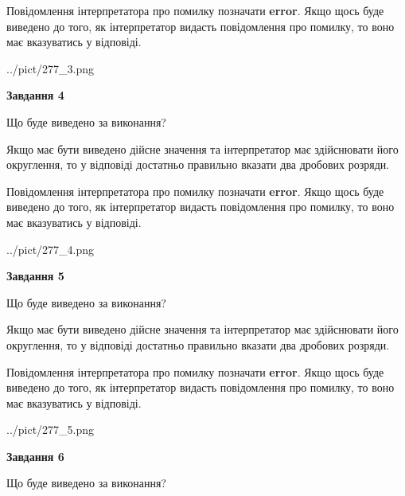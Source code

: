 \documentclass[12pt, ukrainian]{article}
\begin{document}
{\begin {Large}
Повідомлення інтерпретатора про помилку позначати \textbf{error}.
Якщо щось буде виведено до того, як інтерпретатор видасть повідомлення про помилку, 
то воно має вказуватись у відповіді. \par

\begin{center}
	{../pict/277_3.png}
\end{center}
\newpage

{\begin {center}\textbf{Завдання 4}\end {center}}\par
Що буде виведено за виконання? \par

Якщо має бути виведено дійсне значення та інтерпретатор має здійснювати його округлення, 
то у відповіді достатньо правильно вказати два дробових розряди.

Повідомлення інтерпретатора про помилку позначати \textbf{error}.
Якщо щось буде виведено до того, як інтерпретатор видасть повідомлення про помилку, 
то воно має вказуватись у відповіді. \par

\begin{center}
	{../pict/277_4.png}
\end{center}
\newpage

{\begin {center}\textbf{Завдання 5}\end {center}}\par
Що буде виведено за виконання? \par

Якщо має бути виведено дійсне значення та інтерпретатор має здійснювати його округлення, 
то у відповіді достатньо правильно вказати два дробових розряди.

Повідомлення інтерпретатора про помилку позначати \textbf{error}.
Якщо щось буде виведено до того, як інтерпретатор видасть повідомлення про помилку, 
то воно має вказуватись у відповіді. \par

\begin{center}
	{../pict/277_5.png}
\end{center}
\newpage

{\begin {center}\textbf{Завдання 6}\end {center}}\par
Що буде виведено за виконання? \par


\end{Large}}
\end{document}
